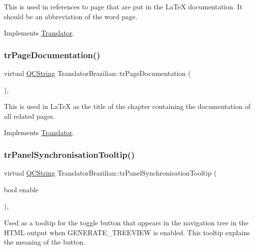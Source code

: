 This is used in references to page that are put in the La\+TeX documentation. It should be an abbreviation of the word page. 

Implements \mbox{\hyperlink{class_translator}{Translator}}.

\mbox{\label{class_translator_brazilian_a023d8f069431b666e9554d9fb6b35016}} 
\subsubsection{\texorpdfstring{trPageDocumentation()}{trPageDocumentation()}}
{\footnotesize\ttfamily virtual \mbox{\hyperlink{class_q_c_string}{Q\+C\+String}} Translator\+Brazilian\+::tr\+Page\+Documentation (\begin{DoxyParamCaption}{ }\end{DoxyParamCaption})\hspace{0.3cm}{\ttfamily [inline]}, {\ttfamily [virtual]}}

This is used in La\+TeX as the title of the chapter containing the documentation of all related pages. 

Implements \mbox{\hyperlink{class_translator}{Translator}}.

\mbox{\label{class_translator_brazilian_aebe00e16cdea8ea6c3b4636b2c6628c5}} 
\subsubsection{\texorpdfstring{trPanelSynchronisationTooltip()}{trPanelSynchronisationTooltip()}}
{\footnotesize\ttfamily virtual \mbox{\hyperlink{class_q_c_string}{Q\+C\+String}} Translator\+Brazilian\+::tr\+Panel\+Synchronisation\+Tooltip (\begin{DoxyParamCaption}\item[{bool}]{enable }\end{DoxyParamCaption})\hspace{0.3cm}{\ttfamily [inline]}, {\ttfamily [virtual]}}

Used as a tooltip for the toggle button that appears in the navigation tree in the H\+T\+ML output when G\+E\+N\+E\+R\+A\+T\+E\+\_\+\+T\+R\+E\+E\+V\+I\+EW is enabled. This tooltip explains the meaning of the button. 

